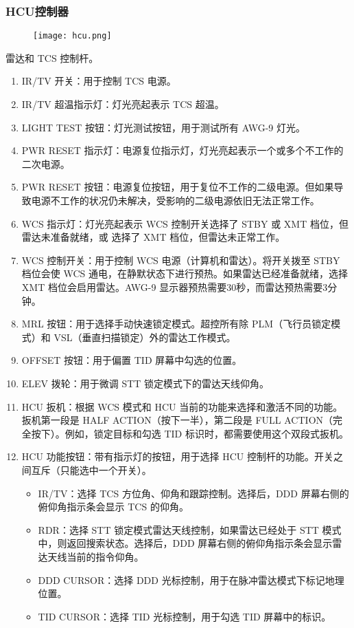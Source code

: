 \subsubsection{HCU控制器}
\begin{figure}[htb]
  \center
  \texttt{[image: hcu.png]}
\end{figure}
雷达和 TCS 控制杆。

\begin{enumerate}
  \item IR/TV 开关：用于控制 TCS 电源。
  \item IR/TV 超温指示灯：灯光亮起表示 TCS 超温。
  \item LIGHT TEST 按钮：灯光测试按钮，用于测试所有 AWG-9 灯光。
  \item PWR RESET 指示灯：电源复位指示灯，灯光亮起表示一个或多个不工作的二次电源。
  \item PWR RESET 按钮：电源复位按钮，用于复位不工作的二级电源。但如果导致电源不工作的状况仍未解决，受影响的二级电源依旧无法正常工作。
  \item WCS 指示灯：灯光亮起表示 WCS 控制开关选择了 STBY 或 XMT 档位，但雷达未准备就绪，或 选择了 XMT 档位，但雷达未正常工作。
  \item WCS 控制开关：用于控制 WCS 电源（计算机和雷达）。将开关拨至 STBY 档位会使 WCS 通电，在静默状态下进行预热。如果雷达已经准备就绪，选择 XMT 档位会启用雷达。AWG-9 显示器预热需要30秒，而雷达预热需要3分钟。
  \item MRL 按钮：用于选择手动快速锁定模式。超控所有除 PLM（飞行员锁定模式）和 VSL（垂直扫描锁定）外的雷达工作模式。
  \item OFFSET 按钮：用于偏置 TID 屏幕中勾选的位置。
  \item ELEV 拨轮：用于微调 STT 锁定模式下的雷达天线仰角。
  \item HCU 扳机：根据 WCS 模式和 HCU 当前的功能来选择和激活不同的功能。扳机第一段是 HALF ACTION（按下一半），第二段是 FULL ACTION（完全按下）。例如，锁定目标和勾选 TID 标识时，都需要使用这个双段式扳机。
  \item HCU 功能按钮：带有指示灯的按钮，用于选择 HCU 控制杆的功能。开关之间互斥（只能选中一个开关）。
  \begin{itemize}
    \item IR/TV：选择 TCS 方位角、仰角和跟踪控制。选择后，DDD 屏幕右侧的俯仰角指示条会显示 TCS 的仰角。
    \item RDR：选择 STT 锁定模式雷达天线控制，如果雷达已经处于 STT 模式中，则返回搜索状态。选择后，DDD 屏幕右侧的俯仰角指示条会显示雷达天线当前的指令仰角。
    \item DDD CURSOR：选择 DDD 光标控制，用于在脉冲雷达模式下标记地理位置。
    \item TID CURSOR：选择 TID 光标控制，用于勾选 TID 屏幕中的标识。
  \end{itemize}
\end{enumerate}

